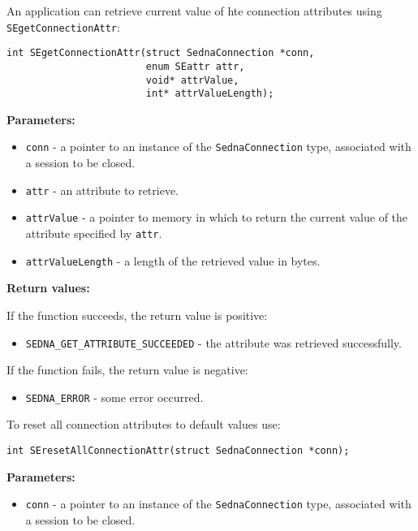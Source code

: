 \documentclass[a4paper,12pt]{article}
\newenvironment{citemize}
{\begin{itemize}
  \setlength{\itemsep}{0pt}
  \setlength{\parskip}{0pt}
  \setlength{\parsep}{0pt}}
{\end{itemize}}
\begin{document}
An application can retrieve current value of hte connection attributes using
\verb!SEgetConnectionAttr!:

\begin{verbatim}
int SEgetConnectionAttr(struct SednaConnection *conn,
                        enum SEattr attr,
                        void* attrValue,
                        int* attrValueLength);
\end{verbatim}

\noindent
\textbf{Parameters:}

\begin{citemize}
\item\verb!conn! - a pointer to an instance of the \verb!SednaConnection! type,
associated with a session to be closed.
\item\verb!attr! - an attribute to retrieve.
\item\verb!attrValue! - a pointer to memory in which to return the current value
of the attribute specified by \verb!attr!.
\item\verb!attrValueLength! - a length of the retrieved value in bytes.
\end{citemize}

\noindent
\textbf{Return values:}

\medskip

\noindent
If the function succeeds, the return value is positive:

\begin{citemize}
\item\verb!SEDNA_GET_ATTRIBUTE_SUCCEEDED! - the attribute was retrieved
successfully.
\end{citemize}

\noindent
If the function fails, the return value is negative:

\begin{citemize}
\item\verb!SEDNA_ERROR! - some error occurred.
\end{citemize}

To reset all connection attributes to default values use:

\begin{verbatim}
int SEresetAllConnectionAttr(struct SednaConnection *conn);
\end{verbatim}

\noindent
\textbf{Parameters:}

\begin{citemize}
\item\verb!conn! - a pointer to an instance of the \verb!SednaConnection! type,
associated with a session to be closed.
\end{citemize}
\end{document}
